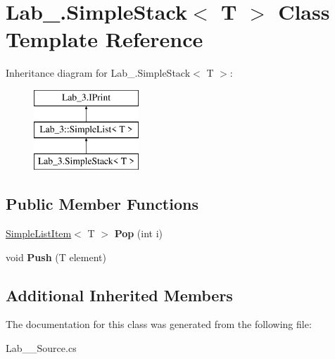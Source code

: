 \hypertarget{class_lab__3_1_1_simple_stack}{}\section{Lab\+\_.\+Simple\+Stack$<$ T $>$ Class Template Reference}
\label{class_lab__3_1_1_simple_stack}
Inheritance diagram for Lab\+\_.\+Simple\+Stack$<$ T $>$\+:\begin{figure}[H]
\begin{center}
\leavevmode
\includegraphics[height=3.000000cm]{class_lab__3_1_1_simple_stack}
\end{center}
\end{figure}
\subsection*{Public Member Functions}
\begin{DoxyCompactItemize}
\item 
\mbox{\label{class_lab__3_1_1_simple_stack_a2d3f3ff8776f484420b01e8812a07ae8}} 
\hyperlink{class_lab__3_1_1_simple_list_item}{Simple\+List\+Item}$<$ T $>$ {\bfseries Pop} (int i)
\item 
\mbox{\label{class_lab__3_1_1_simple_stack_a4315fe36c3b6ae612278243b5d5ba7ec}} 
void {\bfseries Push} (T element)
\end{DoxyCompactItemize}
\subsection*{Additional Inherited Members}


The documentation for this class was generated from the following file\+:\begin{DoxyCompactItemize}
\item 
Lab\+\_\+\_\+\+Source.\+cs\end{DoxyCompactItemize}
